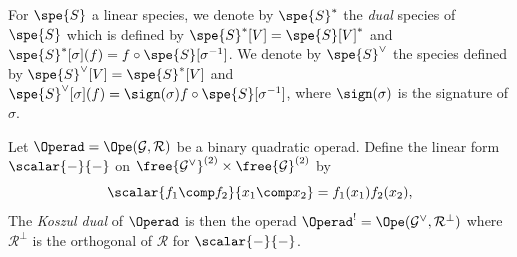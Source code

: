 For $\spe{S}$ a linear species, we denote by $\spe{S}^*$ the {\em dual} species of $\spe{S}$ which is defined by $\spe{S}^*[V]=\spe{S}[V]^*$ and 
$\spe{S}^*[\sigma](f) = f\circ\spe{S}[\sigma^{-1}]$. We denote by $\spe{S}^\vee$ the species defined by $\spe{S}^\vee[V]=\spe{S}^*[V]$ and
$\spe{S}^\vee[\sigma](f) = \sign(\sigma)f\circ\spe{S}[\sigma^{-1}]$, where $\sign(\sigma)$ is the signature of $\sigma$. 

\begin{defi}
    Let $\Operad =\Ope(\mathcal{G},\mathcal{R})$ be a binary quadratic operad. Define the linear form $\scalar{ -}{ -}$ on 
    $\free{\mathcal{G}^{\vee}}^{(2)}\times\free{\mathcal{G}}^{(2)}$ by
    \begin{equation}
        \scalar{f_1\comp f_2}{x_1\comp x_2} = f_1(x_1)f_2(x_2),
    \end{equation}
    The {\em Koszul dual} of $\Operad$ is then the operad $\Operad^!=\Ope(\mathcal{G}^{\vee},\mathcal{R}^{\bot})$
    where $\mathcal{R}^{\bot}$ is the orthogonal of $\mathcal{R}$ for $\scalar{-}{-}$.
\end{defi}


